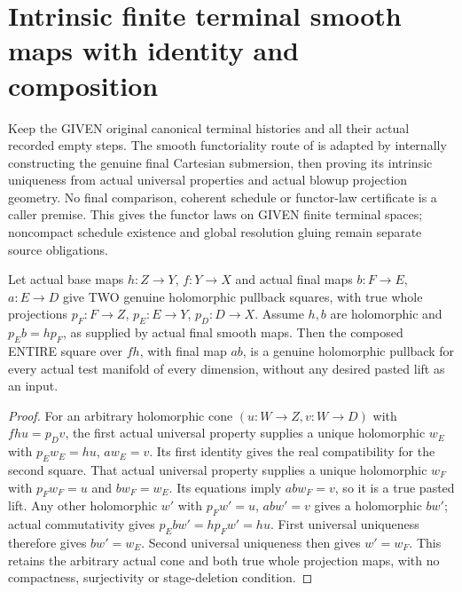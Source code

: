 \section{Intrinsic finite terminal smooth maps with identity and composition}

Keep the GIVEN original canonical terminal histories and all their actual
recorded empty steps. The smooth functoriality route of
\cite{bierstone-milman08-functoriality} is adapted by internally constructing
the genuine final Cartesian submersion, then proving its intrinsic
uniqueness from actual universal properties and actual blowup projection
geometry. No final comparison, coherent schedule or functor-law certificate
is a caller premise. This gives the functor laws on GIVEN finite terminal
spaces; noncompact schedule existence and global resolution gluing remain
separate source obligations.

\begin{lemma}
\label{hir:smooth-terminal-whole-holomorphic-pullback-pasting}
\leanok
{}
Let actual base maps $h:Z\to Y$, $f:Y\to X$ and actual final maps
$b:F\to E$, $a:E\to D$ give TWO genuine holomorphic pullback squares,
with true whole projections $p_F:F\to Z$, $p_E:E\to Y$, $p_D:D\to X$.
Assume $h,b$ are holomorphic and $p_Eb=hp_F$, as supplied by actual
final smooth maps. Then the composed ENTIRE square over $fh$, with final
map $ab$, is a genuine holomorphic pullback for every actual test manifold
of every dimension, without any desired pasted lift as an input.
\end{lemma}
\begin{proof}
For an arbitrary holomorphic cone $(u:W\to Z,v:W\to D)$ with
$fhu=p_Dv$, the first actual universal property supplies a unique
holomorphic $w_E$ with $p_Ew_E=hu$, $aw_E=v$. Its first identity gives
the real compatibility for the second square. That actual universal
property supplies a unique holomorphic $w_F$ with $p_Fw_F=u$ and
$bw_F=w_E$. Its equations imply $abw_F=v$, so it is a true pasted lift.
Any other holomorphic $w'$ with $p_Fw'=u$, $abw'=v$ gives a holomorphic
$bw'$; actual commutativity gives $p_Ebw'=hp_Fw'=hu$. First universal
uniqueness therefore gives $bw'=w_E$. Second universal uniqueness then
gives $w'=w_F$. This retains the arbitrary actual cone and both true
whole projection maps, with no compactness, surjectivity or stage-deletion
condition.
\end{proof}

